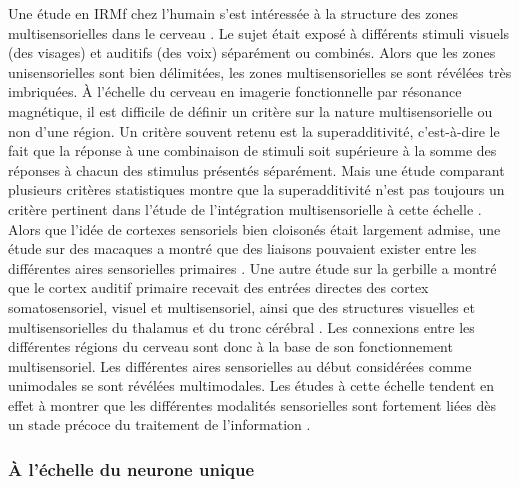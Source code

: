 Une étude en IRMf chez l'humain s'est intéressée à la structure des zones multisensorielles dans le cerveau \cite{beauchamp_unraveling_2004}. Le sujet était exposé à différents stimuli visuels (des visages) et auditifs (des voix) séparément ou combinés. Alors que les zones unisensorielles sont bien délimitées, les zones multisensorielles se sont révélées très imbriquées.
À l'échelle du cerveau en imagerie fonctionnelle par résonance magnétique, il est difficile de définir un critère sur la nature multisensorielle ou non d'une région. Un critère souvent retenu est la superadditivité, c'est-à-dire le fait que la réponse à une combinaison de stimuli soit supérieure à la somme des réponses à chacun des stimulus présentés séparément. Mais une étude comparant plusieurs critères statistiques montre que la superadditivité n'est pas toujours un critère pertinent dans l'étude de l'intégration multisensorielle à cette échelle \cite{beauchamp_statistical_2005}.
Alors que l'idée de cortexes sensoriels bien cloisonés était largement admise, une étude sur des macaques a montré que des liaisons pouvaient exister entre les différentes aires sensorielles primaires \cite{brosch_nonauditory_2005}. Une autre étude sur la gerbille a montré que le cortex auditif primaire recevait des entrées directes des cortex somatosensoriel, visuel et multisensoriel, ainsi que des structures visuelles et multisensorielles du thalamus et du tronc cérébral \cite{budinger_multisensory_2006}.
Les connexions entre les différentes régions du cerveau sont donc à la base de son fonctionnement multisensoriel. Les différentes aires sensorielles au début considérées comme unimodales se sont révélées multimodales. Les études à cette échelle tendent en effet à montrer que les différentes modalités sensorielles sont fortement liées dès un stade précoce du traitement de l'information \cite{stein_multisensory_2008}.


\subsubsection{À l'échelle du neurone unique}

